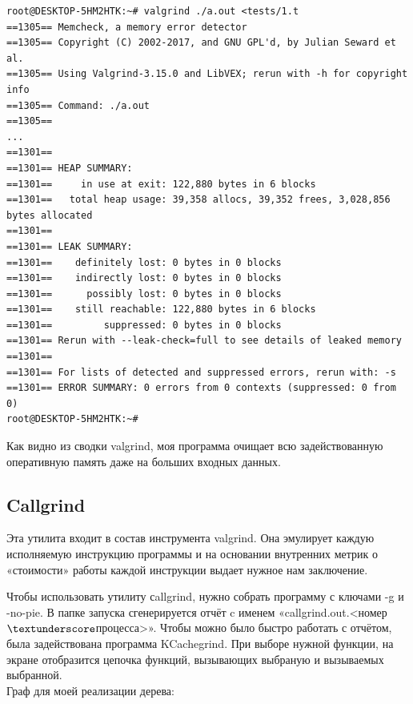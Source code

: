 \begin{verbatim}
root@DESKTOP-5HM2HTK:~# valgrind ./a.out <tests/1.t
==1305== Memcheck, a memory error detector
==1305== Copyright (C) 2002-2017, and GNU GPL'd, by Julian Seward et al.
==1305== Using Valgrind-3.15.0 and LibVEX; rerun with -h for copyright info
==1305== Command: ./a.out
==1305==
...
==1301==
==1301== HEAP SUMMARY:
==1301==     in use at exit: 122,880 bytes in 6 blocks
==1301==   total heap usage: 39,358 allocs, 39,352 frees, 3,028,856 bytes allocated
==1301==
==1301== LEAK SUMMARY:
==1301==    definitely lost: 0 bytes in 0 blocks
==1301==    indirectly lost: 0 bytes in 0 blocks
==1301==      possibly lost: 0 bytes in 0 blocks
==1301==    still reachable: 122,880 bytes in 6 blocks
==1301==         suppressed: 0 bytes in 0 blocks
==1301== Rerun with --leak-check=full to see details of leaked memory
==1301==
==1301== For lists of detected and suppressed errors, rerun with: -s
==1301== ERROR SUMMARY: 0 errors from 0 contexts (suppressed: 0 from 0)
root@DESKTOP-5HM2HTK:~#
\end{verbatim}

Как видно из сводки valgrind, моя программа очищает всю задействованную оперативную память даже на больших входных данных.

\subsection{Callgrind}
Эта утилита входит в состав инструмента valgrind. Она эмулирует
каждую исполняемую инструкцию программы и на основании внутренних метрик о «стоимости» работы каждой инструкции выдает нужное нам заключение.

Чтобы использовать утилиту сallgrind, нужно собрать программу с ключами -g и -no-pie. В папке запуска сгенерируется отчёт c именем «callgrind.out.<номер$\textunderscore$процесса>». Чтобы можно было быстро работать с отчётом, была задействована программа KCachegrind. При выборе нужной функции, на экране отобразится цепочка функций, вызывающих выбраную и вызываемых выбранной. \\
Граф для моей реализации дерева:

